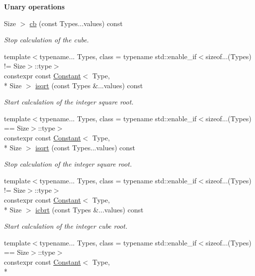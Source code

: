 \begin{Indent}{\bf Unary operations}
\begin{DoxyCompactItemize}
Size $>$ \hyperlink{exceptionmagrathea_1_1Constant_ae91a46a161e8ea78f4caf4c7ed3bdcee}{cb} (const Types...\-values) const 
\begin{DoxyCompactList}\small\item\em Stop calculation of the cube. \end{DoxyCompactList}\item 
{\footnotesize template$<$typename... Types, class  = typename std\-::enable\-\_\-if$<$sizeof...(\-Types) != Size$>$\-::type$>$ }\\constexpr const \hyperlink{exceptionmagrathea_1_1Constant}{Constant}$<$ Type, \\*
Size $>$ \hyperlink{exceptionmagrathea_1_1Constant_a927a26387d1bd73331845708549afb61}{isqrt} (const Types \&...values) const 
\begin{DoxyCompactList}\small\item\em Start calculation of the integer square root. \end{DoxyCompactList}\item 
{\footnotesize template$<$typename... Types, class  = typename std\-::enable\-\_\-if$<$sizeof...(\-Types) == Size$>$\-::type$>$ }\\constexpr const \hyperlink{exceptionmagrathea_1_1Constant}{Constant}$<$ Type, \\*
Size $>$ \hyperlink{exceptionmagrathea_1_1Constant_a94be3659a10d63a5eb93267a27463b4a}{isqrt} (const Types...\-values) const 
\begin{DoxyCompactList}\small\item\em Stop calculation of the integer square root. \end{DoxyCompactList}\item 
{\footnotesize template$<$typename... Types, class  = typename std\-::enable\-\_\-if$<$sizeof...(\-Types) != Size$>$\-::type$>$ }\\constexpr const \hyperlink{exceptionmagrathea_1_1Constant}{Constant}$<$ Type, \\*
Size $>$ \hyperlink{exceptionmagrathea_1_1Constant_afd58fdcea84e4f259c34fc3a922dcee0}{icbrt} (const Types \&...values) const 
\begin{DoxyCompactList}\small\item\em Start calculation of the integer cube root. \end{DoxyCompactList}\item 
{\footnotesize template$<$typename... Types, class  = typename std\-::enable\-\_\-if$<$sizeof...(\-Types) == Size$>$\-::type$>$ }\\constexpr const \hyperlink{exceptionmagrathea_1_1Constant}{Constant}$<$ Type, \\*

\end{DoxyCompactItemize}
\end{Indent}
